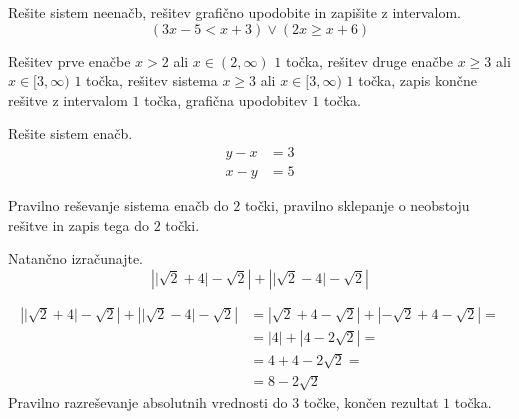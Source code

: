 \documentclass[addpoints,12pt]{exam}
\begin{document}
\begin{questions}
        

    \newpage
    \question[5]
    Rešite sistem neenačb, rešitev grafično upodobite in zapišite z intervalom.
    $$ \left(3x-5<x+3\right)\lor\left(2x\geq x+6\right) $$
    
    
    \begin{solution}[12cm]
        Rešitev prve enačbe $x>2$ ali $x\in(2,\infty)$ $1$ točka, rešitev druge enačbe $x\geq 3$ ali $x\in[3,\infty)$ $1$ točka, rešitev sistema $x\geq 3$ ali $x\in[3,\infty)$ $1$ točka, zapis končne rešitve z intervalom $1$ točka, grafična upodobitev $1$ točka.
    \end{solution}


    
\newpage

    \question[4]
    Rešite sistem enačb.
    $$ \begin{aligned}
        y-x&=3 \\ x-y&=5
    \end{aligned} $$
    
    
    \begin{solution}[7cm]
        Pravilno reševanje sistema enačb do $2$ točki, pravilno sklepanje o neobstoju rešitve in zapis tega do $2$ točki.
    \end{solution}



    
    




    \newpage 

    
    \question[4]
    Natančno izračunajte.
    $$ \left\lvert \lvert\sqrt{2}+4\rvert-\sqrt{2}\right\rvert + \left\lvert \lvert\sqrt{2}-4\rvert-\sqrt{2}\right\rvert $$
    
    
    
    \begin{solution}[11cm]
        \begin{align*}
            \left\lvert \lvert\sqrt{2}+4\rvert-\sqrt{2}\right\rvert + \left\lvert \lvert\sqrt{2}-4\rvert-\sqrt{2}\right\rvert &=
            \left\lvert \sqrt{2}+4-\sqrt{2}\right\rvert + \left\lvert -\sqrt{2}+4-\sqrt{2}\right\rvert= \\
            &= \left\lvert 4\right\rvert + \left\lvert 4-2\sqrt{2}\right\rvert= \\
            &= 4+4-2\sqrt{2}= \\
            &= 8-2\sqrt{2}
        \end{align*}
        Pravilno razreševanje absolutnih vrednosti do $3$ točke, končen rezultat $1$ točka.
    \end{solution}




\end{questions}
\end{document}
